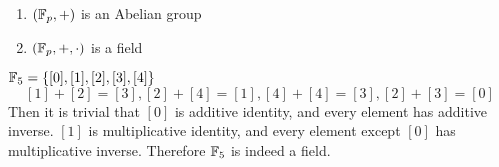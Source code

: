 \begin{lemma}
    \begin{enumerate}
        \item \((\mathbb{F}_p, +)\) is an Abelian group
        \item \((\mathbb{F}_p, +, \cdot)\) is a field
    \end{enumerate}
\end{lemma}

\begin{example}
    \(\mathbb{F}_5 = \{[0], [1], [2], [3], [4]\}\)
    \[
        [1] + [2] = [3], [2] + [4] = [1], [4] + [4] = [3], [2] + [3] = [0]
    \]
    Then it is trivial that \([0]\) is additive identity, and every element has additive inverse. \([1]\) is multiplicative identity, and every element except \([0]\) has multiplicative inverse. Therefore \(\mathbb{F}_5\) is indeed a field.
\end{example}
